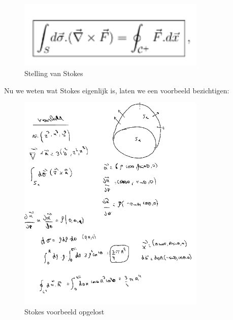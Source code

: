 \documentclass[a4paper]{article}
\begin{document}
\begin{figure}[H]
	\centering
	\includegraphics[width=0.8\textwidth]{assets/Stelling van Stokes.png}
	\caption{Stelling van Stokes}
	\label{fig:stelling-van-stokes}
\end{figure}

Nu we weten wat Stokes eigenlijk is, laten we een voorbeeld bezichtigen:


\begin{figure}[H]
	\centering
	\includegraphics[width=0.8\textwidth]{assets/stokes_voorbeeld_opgelost.png}
	\caption{Stokes voorbeeld opgelost}
	\label{fig:stokes_voorbeeld_opgelost}
\end{figure}
\end{document}
